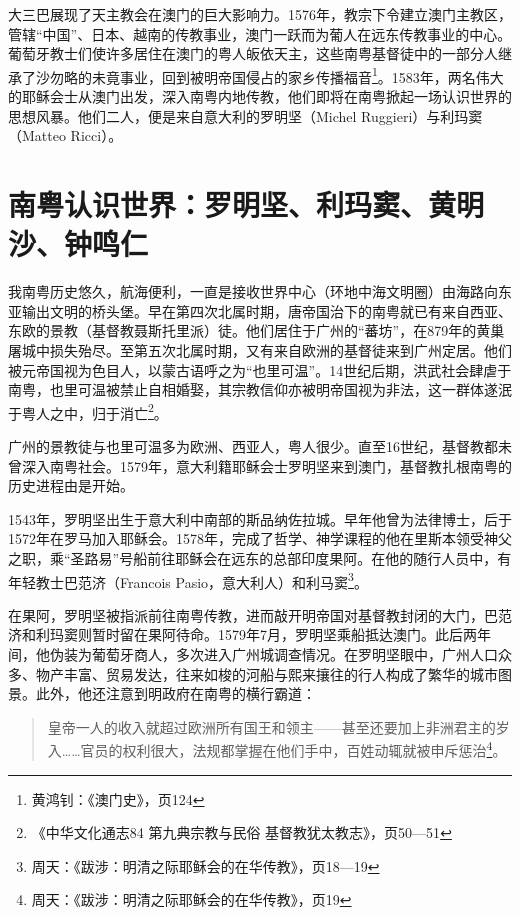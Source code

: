 大三巴展现了天主教会在澳门的巨大影响力。1576年，教宗下令建立澳门主教区，管辖“中国”、日本、越南的传教事业，澳门一跃而为葡人在远东传教事业的中心。葡萄牙教士们使许多居住在澳门的粤人皈依天主，这些南粤基督徒中的一部分人继承了沙勿略的未竟事业，回到被明帝国侵占的家乡传播福音\footnote{黄鸿钊：《澳门史》，页124}。1583年，两名伟大的耶稣会士从澳门出发，深入南粤内地传教，他们即将在南粤掀起一场认识世界的思想风暴。他们二人，便是来自意大利的罗明坚（Michel Ruggieri）与利玛窦（Matteo Ricci）。

\section{南粤认识世界：罗明坚、利玛窦、黄明沙、钟鸣仁}


我南粤历史悠久，航海便利，一直是接收世界中心（环地中海文明圈）由海路向东亚输出文明的桥头堡。早在第四次北属时期，唐帝国治下的南粤就已有来自西亚、东欧的景教（基督教聂斯托里派）徒。他们居住于广州的“蕃坊”，在879年的黄巢屠城中损失殆尽。至第五次北属时期，又有来自欧洲的基督徒来到广州定居。他们被元帝国视为色目人，以蒙古语呼之为“也里可温”。14世纪后期，洪武社会肆虐于南粤，也里可温被禁止自相婚娶，其宗教信仰亦被明帝国视为非法，这一群体遂泯于粤人之中，归于消亡\footnote{《中华文化通志84 第九典宗教与民俗 基督教犹太教志》，页50—51}。

广州的景教徒与也里可温多为欧洲、西亚人，粤人很少。直至16世纪，基督教都未曾深入南粤社会。1579年，意大利籍耶稣会士罗明坚来到澳门，基督教扎根南粤的历史进程由是开始。

1543年，罗明坚出生于意大利中南部的斯品纳佐拉城。早年他曾为法律博士，后于1572年在罗马加入耶稣会。1578年，完成了哲学、神学课程的他在里斯本领受神父之职，乘“圣路易”号船前往耶稣会在远东的总部印度果阿。在他的随行人员中，有年轻教士巴范济（Francois Pasio，意大利人）和利马窦\footnote{周天：《跋涉：明清之际耶稣会的在华传教》，页18—19}。

在果阿，罗明坚被指派前往南粤传教，进而敲开明帝国对基督教封闭的大门，巴范济和利玛窦则暂时留在果阿待命。1579年7月，罗明坚乘船抵达澳门。此后两年间，他伪装为葡萄牙商人，多次进入广州城调查情况。在罗明坚眼中，广州人口众多、物产丰富、贸易发达，往来如梭的河船与熙来攘往的行人构成了繁华的城市图景。此外，他还注意到明政府在南粤的横行霸道：

\begin{quote}

皇帝一人的收入就超过欧洲所有国王和领主——甚至还要加上非洲君主的岁入……官员的权利很大，法规都掌握在他们手中，百姓动辄就被申斥惩治\footnote{周天：《跋涉：明清之际耶稣会的在华传教》，页19}。

\end{quote}

